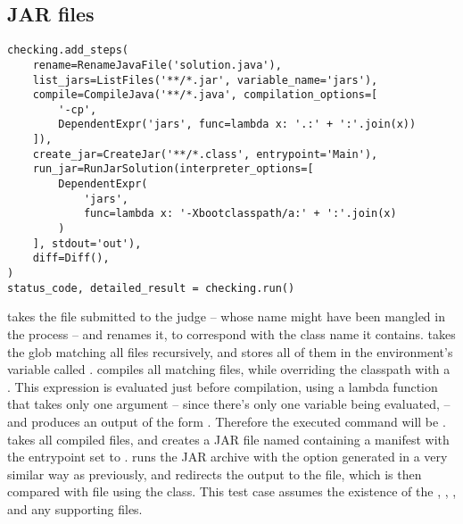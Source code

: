 \subsection{JAR files}

\begin{verbatim}
checking.add_steps(
    rename=RenameJavaFile('solution.java'),
    list_jars=ListFiles('**/*.jar', variable_name='jars'),
    compile=CompileJava('**/*.java', compilation_options=[
        '-cp',
        DependentExpr('jars', func=lambda x: '.:' + ':'.join(x))
    ]),
    create_jar=CreateJar('**/*.class', entrypoint='Main'),
    run_jar=RunJarSolution(interpreter_options=[
        DependentExpr(
            'jars',
            func=lambda x: '-Xbootclasspath/a:' + ':'.join(x)
        )
    ], stdout='out'),
    diff=Diff(),
)
status_code, detailed_result = checking.run()
\end{verbatim}

 takes the file submitted to the judge -- whose name might have been mangled in the process -- and
renames it, to correspond with the class name it contains.
 takes the glob matching all  files recursively, and stores all of them in the environment's
variable called .
 compiles all matching  files, while overriding the classpath with a
.
This expression is evaluated just before compilation, using a lambda function that takes only one argument -- since
there's only one variable being evaluated,  -- and produces an output of the form
.
Therefore the executed command will be .
 takes all compiled  files, and creates a JAR file named 
containing a manifest with the entrypoint set to .
 runs the JAR archive with the  option generated in a very similar way as
previously, and redirects the output to the  file, which is then compared with  file using the
 class.
This test case assumes the existence of the , , , and any supporting
 files.
